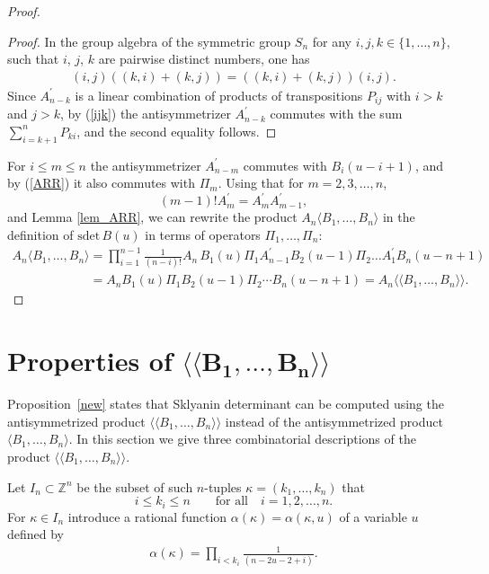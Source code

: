 \documentclass[11pt]{article}
\newcommand{\ZZ}{\mathbb Z}    %
\begin{document}
\begin{proof}
\begin{proof}
In the group algebra of the symmetric group  $S_n$ for any $i,j,k\in\{1,\dots, n\}$, such that $i$, $j$, $k$ are pairwise distinct numbers, one has
\begin{gather}\label{ijk}
(i,j)((k,i)+(k,j))=((k,i)+(k,j))(i,j).
\end{gather}
Since $A^{\prime}_{n-k}$ is a linear combination of products of  transpositions $P_{ij}$ with  $i>k$ and $ j>k $,  by (\ref{ijk})  the antisymmetrizer  $A^{\prime}_{n-k}$ commutes with the sum $\sum_{i=k+1}^{n}P_{ki}$, and the second equality follows.
\end{proof}

 For  $i\le m\le n$ the antisymmetrizer $A^{\prime}_{n-m}$ commutes with $B_i(u-i+1)$,
and by (\ref{ARR}) it also commutes with $\Pi_m$.
Using that for $m=2, 3,\dots, n $,
\[
(m-1)!A^{\prime}_m=A^{\prime}_mA^{\prime}_{m-1},
\]
and Lemma \ref{lem_ARR}, we can   rewrite the product  $A_n \langle  B_1, \dots, B_n\rangle $ in  the def\/inition of $\text{sdet}\, B(u)$ in terms of operators $\Pi_1,\dots, \Pi_n$:
 \begin{gather*}
 A_n \langle  B_1, \dots, B_n\rangle
=  { \prod_{i=1}^{n-1}\frac{1}{(n-i)!}}
   A_n\,B_1(u) \Pi_1A^{\prime}_{n-1}B_2(u-1)\Pi_2\dots A^{\prime}_{1}
B_n(u-n+1)\\
\phantom{A_n \langle  B_1, \dots, B_n\rangle   }{}
=  A_n B_1(u) \Pi_1B_2(u-1)\Pi_2 \cdots
B_n(u-n+1)=A_n \langle \langle  B_1, \dots, B_n\rangle \rangle .\tag*{\qed}
\end{gather*}
\renewcommand{\qed}{}
\end{proof}

\section[Properties of $\langle \langle  B_1, \dots, B_n\rangle \rangle $]{Properties of $\boldsymbol{\langle \langle  B_1, \dots, B_n\rangle \rangle }$}\label{section3}

Proposition~\ref{new}  states that Sklyanin determinant  can be computed  using the  antisymmetrized product  $\langle \langle  B_1, \dots, B_n\rangle \rangle $ instead of the antisymmetrized  product   $\langle  B_1, \dots, B_n\rangle $. In this section   we  give three  combinatorial  descriptions of the product $\langle \langle  B_1, \dots, B_n\rangle \rangle $.

Let $I_n\subset \ZZ^n$  be the subset of such $n$-tuples $\kappa=(k_1, \dots, k_n)$ that
\[
i\le k_i\le n \qquad \text{for all}\quad i=1,2,\dots, n.
\]
 For $\kappa\in I_n$ introduce  a rational function $\alpha{(\kappa)}=\alpha{(\kappa,u)}$ of   a variable $u$ def\/ined by
\begin{gather*}%
\alpha{(\kappa)}=
{\prod_{i< k_{i}} \frac{1}{(n-2u-2+i)}}.
\end{gather*}
\end{document}
